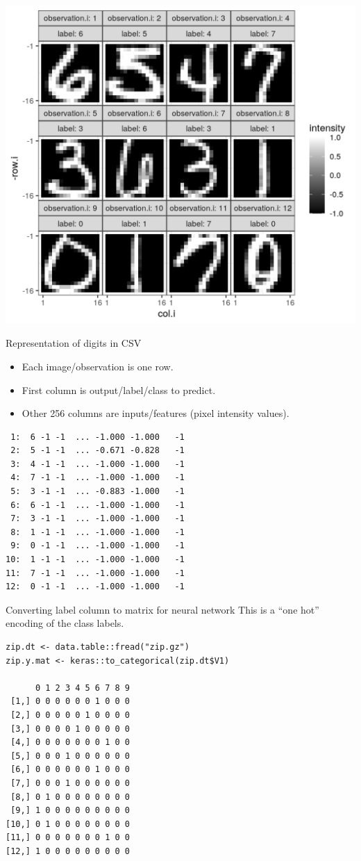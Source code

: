 \documentclass{article}
\begin{document}
  \includegraphics[height=\textheight]{figure-validation-loss-digits}

{Representation of digits in CSV}
  \begin{itemize}
  \item Each image/observation is one row.
  \item First column is output/label/class to predict.
  \item Other 256 columns are inputs/features (pixel intensity
    values).
  \end{itemize}
\begin{verbatim}
 1:  6 -1 -1  ... -1.000 -1.000   -1
 2:  5 -1 -1  ... -0.671 -0.828   -1
 3:  4 -1 -1  ... -1.000 -1.000   -1
 4:  7 -1 -1  ... -1.000 -1.000   -1
 5:  3 -1 -1  ... -0.883 -1.000   -1
 6:  6 -1 -1  ... -1.000 -1.000   -1
 7:  3 -1 -1  ... -1.000 -1.000   -1
 8:  1 -1 -1  ... -1.000 -1.000   -1
 9:  0 -1 -1  ... -1.000 -1.000   -1
10:  1 -1 -1  ... -1.000 -1.000   -1
11:  7 -1 -1  ... -1.000 -1.000   -1
12:  0 -1 -1  ... -1.000 -1.000   -1
\end{verbatim}

{Converting label column to matrix for neural network}
  This is a ``one hot'' encoding of the class labels.
\begin{verbatim}
zip.dt <- data.table::fread("zip.gz")
zip.y.mat <- keras::to_categorical(zip.dt$V1)

      0 1 2 3 4 5 6 7 8 9
 [1,] 0 0 0 0 0 0 1 0 0 0
 [2,] 0 0 0 0 0 1 0 0 0 0
 [3,] 0 0 0 0 1 0 0 0 0 0
 [4,] 0 0 0 0 0 0 0 1 0 0
 [5,] 0 0 0 1 0 0 0 0 0 0
 [6,] 0 0 0 0 0 0 1 0 0 0
 [7,] 0 0 0 1 0 0 0 0 0 0
 [8,] 0 1 0 0 0 0 0 0 0 0
 [9,] 1 0 0 0 0 0 0 0 0 0
[10,] 0 1 0 0 0 0 0 0 0 0
[11,] 0 0 0 0 0 0 0 1 0 0
[12,] 1 0 0 0 0 0 0 0 0 0
\end{verbatim}
\end{document}
